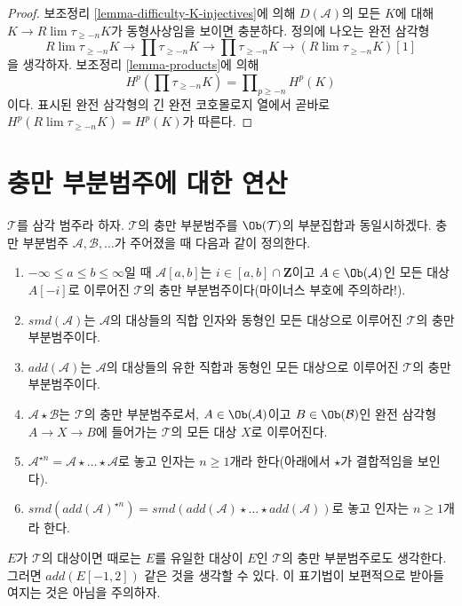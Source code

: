\begin{proof}
보조정리 \ref{lemma-difficulty-K-injectives}에 의해 $D(\mathcal{A})$의
모든 $K$에 대해 $K \to R\lim\tau_{\geq -n}K$가 동형사상임을 보이면
충분하다. 정의에 나오는 완전 삼각형
$$
R\lim\tau_{\geq -n}K \to
\prod \tau_{\geq -n}K \to
\prod \tau_{\geq -n}K \to
(R\lim\tau_{\geq -n}K)[1]
$$
을 생각하자. 보조정리 \ref{lemma-products}에 의해
$$
H^p(\prod \tau_{\geq -n}K) = \prod\nolimits_{p \geq -n} H^p(K)
$$
이다. 표시된 완전 삼각형의 긴 완전 코호몰로지 열에서 곧바로
$H^p(R\lim \tau_{\geq -n}K) = H^p(K)$가 따른다.
\end{proof}

\section{충만 부분범주에 대한 연산}
\label{section-operate-on-full}

\noindent
$\mathcal{T}$를 삼각 범주라 하자. $\mathcal{T}$의 충만 부분범주를
$\Ob(\mathcal{T})$의 부분집합과 동일시하겠다. 충만 부분범주
$\mathcal{A}, \mathcal{B}, \ldots$가 주어졌을 때 다음과 같이 정의한다.
\begin{enumerate}
\item $-\infty \leq a \leq b \leq \infty$일 때
$\mathcal{A}[a, b]$는 $i \in [a, b] \cap \mathbf{Z}$이고
$A \in \Ob(\mathcal{A})$인 모든 대상 $A[-i]$로 이루어진
$\mathcal{T}$의 충만 부분범주이다(마이너스 부호에 주의하라!).
\item $smd(\mathcal{A})$는 $\mathcal{A}$의 대상들의 직합 인자와
동형인 모든 대상으로 이루어진 $\mathcal{T}$의 충만 부분범주이다.
\item $add(\mathcal{A})$는 $\mathcal{A}$의 대상들의 유한 직합과
동형인 모든 대상으로 이루어진 $\mathcal{T}$의 충만 부분범주이다.
\item $\mathcal{A} \star \mathcal{B}$는 $\mathcal{T}$의 충만
부분범주로서, $A \in \Ob(\mathcal{A})$이고 $B \in \Ob(\mathcal{B})$인
완전 삼각형 $A \to X \to B$에 들어가는 $\mathcal{T}$의 모든 대상
$X$로 이루어진다.
\item $\mathcal{A}^{\star n} = \mathcal{A} \star \ldots \star \mathcal{A}$로
놓고 인자는 $n \geq 1$개라 한다(아래에서 $\star$가 결합적임을 보인다).
\item $smd(add(\mathcal{A})^{\star n}) =
smd(add(\mathcal{A}) \star \ldots \star add(\mathcal{A}))$로 놓고
인자는 $n \geq 1$개라 한다.
\end{enumerate}
$E$가 $\mathcal{T}$의 대상이면 때로는 $E$를 유일한 대상이 $E$인
$\mathcal{T}$의 충만 부분범주로도 생각한다. 그러면
$add(E[-1, 2])$ 같은 것을 생각할 수 있다. 이 표기법이 보편적으로
받아들여지는 것은 아님을 주의하자.


